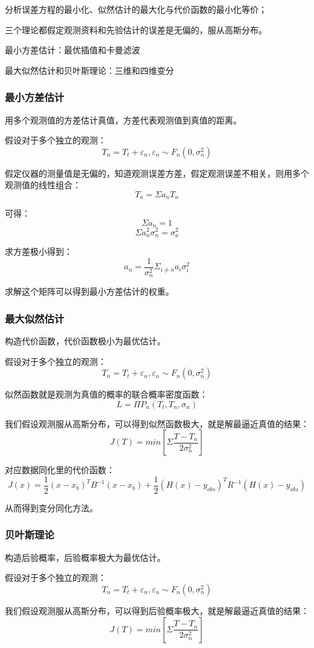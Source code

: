 \documentclass{article}
\begin{document}
分析误差方程的最小化、似然估计的最大化与代价函数的最小化等价；

三个理论都假定观测资料和先验估计的误差是无偏的，服从高斯分布。

最小方差估计：最优插值和卡曼滤波

最大似然估计和贝叶斯理论：三维和四维变分

\subsubsection{最小方差估计}
用多个观测值的方差估计真值，方差代表观测值到真值的距离。

假设对于多个独立的观测：
$$T_n = T_t + \varepsilon_n, \varepsilon_n\sim F_n(0, \sigma^2_n)$$

假定仪器的测量值是无偏的，知道观测误差方差，假定观测误差不相关，则用多个观测值的线性组合：
$$T_a = \Sigma a_n T_n$$

可得：
$$\Sigma a_n = 1$$
$$\Sigma a_n^2 \sigma_n^2 = \sigma_a^2$$

求方差极小得到：
$$a_n = \frac{1}{\sigma_n^2}\Sigma_{i\ne n} a_i\sigma_i^2$$

求解这个矩阵可以得到最小方差估计的权重。

\subsubsection{最大似然估计}
构造代价函数，代价函数极小为最优估计。

假设对于多个独立的观测：
$$T_n = T_t + \varepsilon_n, \varepsilon_n\sim F_n(0, \sigma^2_n)$$

似然函数就是观测为真值的概率的联合概率密度函数：
$$L = \Pi P_n(T_t, T_n, \sigma_n)$$

我们假设观测服从高斯分布，可以得到似然函数极大，就是解最逼近真值的结果：
$$J(T) = min[\Sigma \frac{T-T_n}{2\sigma_n^2}]$$

对应数据同化里的代价函数：
$$J(x) = \frac{1}{2}(x-x_b)^{T}B^{-1}(x-x_b) + \frac{1}{2}(H(x)-y_{obs})^{T}R^{-1}(H(x)-y_{obs})$$

从而得到变分同化方法。

\subsubsection{贝叶斯理论}
构造后验概率，后验概率极大为最优估计。

假设对于多个独立的观测：
$$T_n = T_t + \varepsilon_n, \varepsilon_n\sim F_n(0, \sigma^2_n)$$

我们假设观测服从高斯分布，可以得到后验概率极大，就是解最逼近真值的结果：
$$J(T) = min[\Sigma \frac{T-T_n}{2\sigma_n^2}]$$
\end{document}
